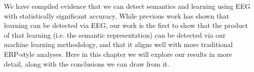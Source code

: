 \label{chapter:discussion}

We have compiled evidence that we can detect semantics and learning using EEG 
with statistically significant accuracy. While previous work has shown that 
learning can be detected via EEG, our work is the first to show that the 
product of that learning (i.e. the semantic representation) can be detected via 
our machine learning methodology, and that it aligns well with more traditional 
ERP-style analyses. Here in this chapter we will explore our results in more 
detail, along with the conclusions we can draw from it.








